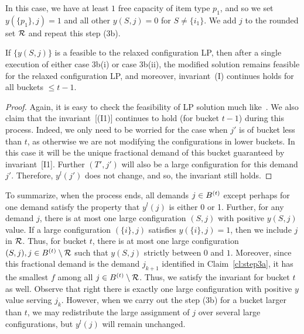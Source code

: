 \medskip {}
In this case, we have at least $1$ free capacity of item type $p_1$, and so we set $y(\{p_1\},j)= 1$ and all other $y(S,j) = 0$ for $S \neq \{i_1\}$. We add $j$ to the rounded set ${\cal R}$ and repeat this step (3b).


\begin{claim} \label{cl:step3b}
If $\{y(S,j)\}$ is a feasible to the relaxed configuration LP, then after a single execution of either case 3b(i) or case 3b(ii), the modified solution remains feasible for the relaxed configuration LP, and moreover, invariant~(I) continues holds for all buckets $\leq t-1$.
\end{claim}
\begin{proof}
Again, it is easy to check the feasibility of LP solution much like~. We also claim that the invariant~[(I1)] continues to hold (for bucket $t-1$) during this process. Indeed, we only need to be worried for the case when $j'$ is of bucket less than $t$, as otherwise we are not modifying the configurations in lower buckets. In this case it will be the unique fractional demand of this bucket guaranteed by invariant~[I1]. Further $(T',j')$ will also be a large configuration for this demand $j'$. Therefore, $y^l(j')$ does not change, and so, the invariant still holds.
\end{proof}

  To summarize, when the process ends, all demands $j \in B^{(t)}$  except perhaps for one demand satisfy the property that $y^l(j)$ is either 0 or 1. Further, for any demand $j$, there is at most one large configuration $(S,j)$ with positive $y(S,j)$ value. If a large configuration $(\{i\},j)$ satisfies $y(\{i\},j)=1$, then we include $j$ in ${\cal R}$. Thus, for bucket $t$, there is at most one large configuration $(S,j), j \in B^{(t)} \setminus {\cal R}$  such that $y(S,j)$ strictly between $0$ and $1$. Moreover, since this fractional demand is the demand $j_{k+1}$ identified in Claim~\ref{cl:step3a}, it has the smallest $f$ among all $j \in B^{(t)} \setminus {\cal R}$. Thus, we satisfy the invariant for bucket $t$ as well. Observe that right there is exactly one large configuration with positive $y$ value serving $j_k$. However, when we carry out the step (3b) for a bucket larger than $t$, we may redistribute the large assignment of $j$ over several large configurations, but $y^l(j)$ will remain unchanged.


